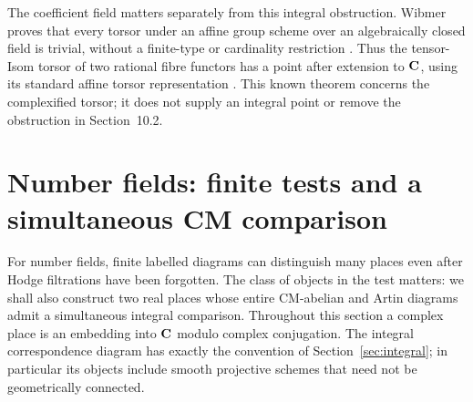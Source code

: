 \documentclass[11pt]{article}
\theoremstyle{definition}\newtheorem{definition}[theorem]{Definition}
\theoremstyle{remark}\newtheorem{remark}[theorem]{Remark}
\begin{document}
The coefficient field matters separately from this integral obstruction.
Wibmer proves that every torsor under an affine group scheme over an
algebraically closed field is trivial, without a finite-type or cardinality
restriction \cite[Theorems~1.1--1.2, p.~447]{Wibmer}. Thus the tensor-Isom
torsor of two rational fibre functors has a point after extension to $\mathbf C$,
using its standard affine torsor representation
\cite[Theorem~3.2, p.~31]{DeligneMilne}. This known theorem concerns the complexified
torsor; it does not supply an integral point or remove the obstruction in
Section~10.2.

\section{Number fields: finite tests and a simultaneous CM comparison}
\label{sec:number-fields}
For number fields, finite labelled diagrams can distinguish many places even
after Hodge filtrations have been forgotten. The class of objects in the test
matters: we shall also construct two real places whose entire CM-abelian and
Artin diagrams admit a simultaneous integral comparison. Throughout this
section a complex place is an embedding into $\mathbf C$ modulo complex conjugation.
The integral correspondence diagram has exactly the convention of
Section~\ref{sec:integral}; in particular its objects include smooth projective
schemes that need not be geometrically connected.
\end{document}
